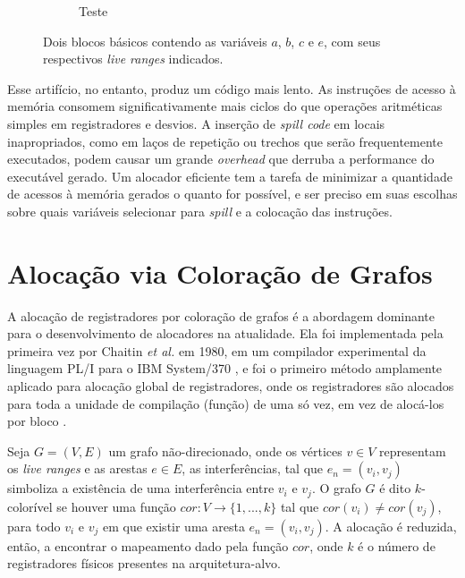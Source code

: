 \documentclass[
	12pt,				%
	openright,			%
	oneside,			%
	a4paper,			%
	tccpreliminar,			%
	]{ABNT-DC-UEL}
\begin{document}
\begin{figure}
\begin{subfigure}{0.4\textwidth}
        \caption{Teste}
    \end{subfigure}
    \caption{Dois blocos básicos contendo as variáveis $a$, $b$, $c$ e $e$, com seus respectivos \textit{live ranges} indicados.}
    \label{fig:4}
\end{figure}

Esse artifício, no entanto, produz um código mais lento. As instruções de acesso à memória consomem significativamente mais ciclos do que operações aritméticas simples em registradores e desvios. A inserção de \textit{spill code} em locais inapropriados, como em laços de repetição ou trechos que serão frequentemente executados, podem causar um grande \textit{overhead} que derruba a performance do executável gerado. Um alocador eficiente tem a tarefa de minimizar a quantidade de acessos à memória gerados o quanto for possível, e ser preciso em suas escolhas sobre quais variáveis selecionar para \textit{spill} e a colocação das instruções.

\section{Alocação via Coloração de Grafos}

A alocação de registradores por coloração de grafos é a abordagem dominante para o desenvolvimento de alocadores na atualidade. Ela foi implementada pela primeira vez por Chaitin \textit{et al.} em 1980, em um compilador experimental da linguagem PL/I para o IBM System/370 \cite{chaitin:81}, e foi o primeiro método amplamente aplicado para alocação global de registradores, onde os registradores são alocados para toda a unidade de compilação (função) de uma só vez, em vez de alocá-los por bloco \cite{eisl:16}.

Seja $G = (V, E)$ um grafo não-direcionado, onde os vértices $v \in V$ representam os \textit{live ranges} e as arestas $e \in E$, as interferências, tal que $e_n = (v_i, v_j)$ simboliza a existência de uma interferência entre $v_i$ e $v_j$. O grafo $G$ é dito $k$-colorível se houver uma função $cor: V \to \{1,...,k\}$ tal que $cor(v_i) \ne cor(v_j)$, para todo $v_i$ e $v_j$ em que existir uma aresta
$e_n = (v_i, v_j)$. A alocação é reduzida, então, a encontrar o mapeamento dado pela função $cor$, onde $k$ é o número de registradores físicos presentes na arquitetura-alvo.
\end{document}
